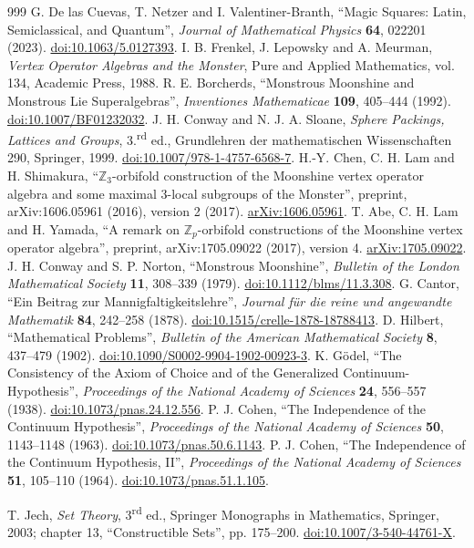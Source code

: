 \begin{thebibliography}{999}
 G. De las Cuevas, T. Netzer and I. Valentiner-Branth, ``Magic Squares: Latin, Semiclassical, and Quantum'', \emph{Journal of Mathematical Physics} \textbf{64}, 022201 (2023). \href{https://doi.org/10.1063/5.0127393}{doi:10.1063/5.0127393}.
 I. B. Frenkel, J. Lepowsky and A. Meurman, \emph{Vertex Operator Algebras and the Monster}, Pure and Applied Mathematics, vol. 134, Academic Press, 1988.
 R. E. Borcherds, ``Monstrous Moonshine and Monstrous Lie Superalgebras'', \emph{Inventiones Mathematicae} \textbf{109}, 405--444 (1992). \href{https://doi.org/10.1007/BF01232032}{doi:10.1007/BF01232032}.
 J. H. Conway and N. J. A. Sloane, \emph{Sphere Packings, Lattices and Groups}, 3.\textsuperscript{rd} ed., Grundlehren der mathematischen Wissenschaften 290, Springer, 1999. \href{https://doi.org/10.1007/978-1-4757-6568-7}{doi:10.1007/978-1-4757-6568-7}.
 H.-Y. Chen, C. H. Lam and H. Shimakura, ``\(\mathbb Z_3\)-orbifold construction of the Moonshine vertex operator algebra and some maximal \(3\)-local subgroups of the Monster'', preprint, arXiv:1606.05961 (2016), version 2 (2017). \href{https://arxiv.org/abs/1606.05961}{arXiv:1606.05961}.
 T. Abe, C. H. Lam and H. Yamada, ``A remark on \(\mathbb Z_p\)-orbifold constructions of the Moonshine vertex operator algebra'', preprint, arXiv:1705.09022 (2017), version 4. \href{https://arxiv.org/abs/1705.09022v4}{arXiv:1705.09022}.
 J. H. Conway and S. P. Norton, ``Monstrous Moonshine'', \emph{Bulletin of the London Mathematical Society} \textbf{11}, 308--339 (1979). \href{https://doi.org/10.1112/blms/11.3.308}{doi:10.1112/blms/11.3.308}.
 G. Cantor, ``Ein Beitrag zur Mannigfaltigkeitslehre'',
\emph{Journal für die reine und angewandte Mathematik} \textbf{84},
242--258 (1878). \href{https://doi.org/10.1515/crelle-1878-18788413}{doi:10.1515/crelle-1878-18788413}.
 D. Hilbert, ``Mathematical Problems'',
\emph{Bulletin of the American Mathematical Society} \textbf{8},
437--479 (1902). \href{https://doi.org/10.1090/S0002-9904-1902-00923-3}{doi:10.1090/S0002-9904-1902-00923-3}.
 K. Gödel, ``The Consistency of the Axiom of Choice and
of the Generalized Continuum-Hypothesis'', \emph{Proceedings of the National
Academy of Sciences} \textbf{24}, 556--557 (1938).
\href{https://doi.org/10.1073/pnas.24.12.556}{doi:10.1073/pnas.24.12.556}.
 P. J. Cohen, ``The Independence of the Continuum
Hypothesis'', \emph{Proceedings of the National Academy of Sciences}
\textbf{50}, 1143--1148 (1963).
\href{https://doi.org/10.1073/pnas.50.6.1143}{doi:10.1073/pnas.50.6.1143}.
 P. J. Cohen, ``The Independence of the Continuum
Hypothesis, II'', \emph{Proceedings of the National Academy of Sciences}
\textbf{51}, 105--110 (1964).
\href{https://doi.org/10.1073/pnas.51.1.105}{doi:10.1073/pnas.51.1.105}.

 T. Jech, \emph{Set Theory}, 3\textsuperscript{rd} ed.,
Springer Monographs in Mathematics, Springer, 2003; chapter 13,
``Constructible Sets'', pp. 175--200.
\href{https://doi.org/10.1007/3-540-44761-X}{doi:10.1007/3-540-44761-X}.

\end{thebibliography}
